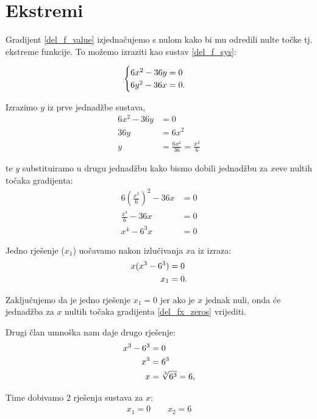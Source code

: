 \section{Ekstremi}

Gradijent \eqref{del_f_value} izjednačujemo s nulom kako bi mu odredili nulte točke tj. ekstreme funkcije.
To možemo izraziti kao sustav \eqref{del_f_sys}:

$$
\begin{cases}
    6x^2 - 36y = 0 \\
    6y^2 - 36x = 0 \textnormal{.}
\end{cases}
$$

Izrazimo $y$ iz prve jednadžbe sustava,
\begin{align*}
    6x^2 - 36y &= 0 \\
    36y &= 6x^2 \\
    y &= \frac{6x^2}{36} = \frac{x^2}{6}
\end{align*}

te $y$ substituiramo u drugu jednadžbu kako bismo dobili jednadžbu za $x$eve nultih točaka gradijenta:
\begin{align}
    6(\frac{x^2}{6})^2 - 36x &= 0 \nonumber \\
    \frac{x^4}{6} - 36x &= 0 \nonumber \\
    x^4 - 6^3x &= 0 \label{del_fx_zeros}
\end{align}

Jedno rješenje ($x_1$) uočavamo nakon izlučivanja $x$a iz izraza:
\begin{align*}
    x(x^3 - 6^3) &= 0 \\
    x_1 &= 0 \textnormal{.}
\end{align*}

Zaključujemo da je jedno rješenje $x_1 = 0$ jer ako je $x$ jednak nuli, onda će jednadžba za $x$ nultih točaka gradijenta \eqref{del_fx_zeros} vrijediti. \par

Drugi član umnoška nam daje drugo rješenje:
\begin{align*}
    x^3 - 6^3 &= 0 \\
    x^3 &= 6^3 \\
    x &= \sqrt[3]{6^3} = 6 \textnormal{,}
\end{align*}

Time dobivamo 2 rješenja sustava za $x$:
\begin{gather*}
    x_1 = 0 \qquad x_2 = 6
\end{gather*}

